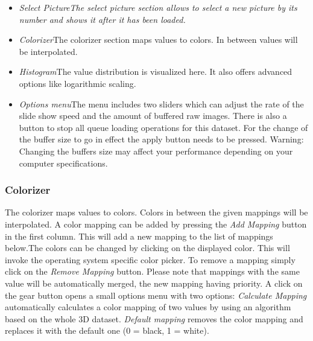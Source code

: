 \begin{itemize}
  \item{\emph{Select Picture\newline The select picture section allows to select a new picture by its number and shows it after it has been loaded.}}
  \item{\emph{Colorizer}\newline The colorizer section maps values to colors. In between values will be interpolated.}
  \item{\emph{Histogram}\newline The value distribution is visualized here. It also offers advanced options like logarithmic scaling.}
  \item{\emph{Options menu}\newline The menu includes two sliders which can adjust the rate of the slide show speed and the amount of buffered raw images. There is also a button to stop all queue loading operations for this dataset. For the change of the buffer size to go in effect the apply button needs to be pressed. Warning: Changing the buffers size may affect your performance depending on your computer specifications.}
\end{itemize}

\subsubsection{Colorizer}

The colorizer maps values to colors. Colors in between the given mappings will be interpolated. A color mapping can be added by pressing the \emph{Add Mapping} button in the first column. This will add a new mapping to the list of mappings below.\newline The colors can be changed by clicking on the displayed color. This will invoke the operating system specific color picker. \newline To remove a mapping simply click on the \emph{Remove Mapping} button. \newline Please note that mappings with the same value will be automatically merged, the new mapping having priority. \newline A click on the gear button opens a small options menu with two options: \emph{Calculate Mapping} automatically calculates a color mapping of two values by using an algorithm based on the whole 3D dataset. \emph{Default mapping} removes the color mapping and replaces it with the default one (0 = black, 1 = white).

